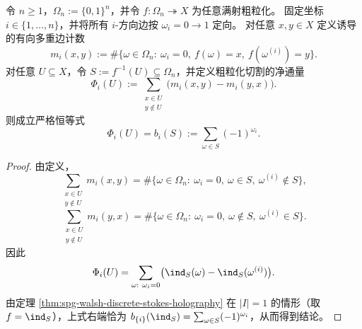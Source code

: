\begin{theorem}[粗粒化切割的净通量等于体积偏差]\label{thm:spg-coarsegrained-cut-flux-volume-bias}
令 \(n\ge 1\)，\(\Omega_n:=\{0,1\}^n\)，并令 \(f:\Omega_n\twoheadrightarrow X\) 为任意满射粗粒化。
固定坐标 \(i\in\{1,\dots,n\}\)，并将所有 \(i\)-方向边按 \(\omega_i=0\to 1\) 定向。
对任意 \(x,y\in X\) 定义诱导的有向多重边计数
\[
m_i(x,y):=\#\{\omega\in\Omega_n:\ \omega_i=0,\ f(\omega)=x,\ f(\omega^{(i)})=y\}.
\]
对任意 \(U\subseteq X\)，令 \(S:=f^{-1}(U)\subseteq\Omega_n\)，并定义粗粒化切割的净通量
\[
\Phi_i(U):=\sum_{\substack{x\in U\\ y\notin U}}\bigl(m_i(x,y)-m_i(y,x)\bigr).
\]
则成立严格恒等式
\[
\boxed{\;\Phi_i(U)=b_i(S):=\sum_{\omega\in S}(-1)^{\omega_i}.\;}
\]
\end{theorem}
\begin{proof}
由定义，
\[
\sum_{\substack{x\in U\\ y\notin U}}m_i(x,y)
=\#\{\omega\in\Omega_n:\ \omega_i=0,\ \omega\in S,\ \omega^{(i)}\notin S\},
\]
\[
\sum_{\substack{x\in U\\ y\notin U}}m_i(y,x)
=\#\{\omega\in\Omega_n:\ \omega_i=0,\ \omega\notin S,\ \omega^{(i)}\in S\}.
\]
因此
\[
\Phi_i(U)
=\sum_{\omega:\ \omega_i=0}\bigl(\ind_S(\omega)-\ind_S(\omega^{(i)})\bigr).
\]
由定理 \ref{thm:spg-walsh-discrete-stokes-holography} 在 \(|I|=1\) 的情形（取 \(f=\ind_S\)），上式右端恰为 \(b_{\{i\}}(\ind_S)=\sum_{\omega\in S}(-1)^{\omega_i}\)，从而得到结论。
\end{proof}

\endinput

